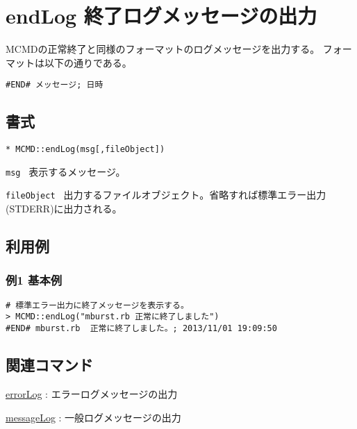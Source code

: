 
%

\section{endLog 終了ログメッセージの出力\label{sect:endLog}}
MCMDの正常終了と同様のフォーマットのログメッセージを出力する。
フォーマットは以下の通りである。

\begin{Verbatim}[baselinestretch=0.7,frame=single]
#END# メッセージ; 日時
\end{Verbatim}


\subsection{書式}

{\Large
\begin{verbatim}
* MCMD::endLog(msg[,fileObject])
\end{verbatim}
} 

\begin{description}
	\setlength{\itemindent}{-5mm}
	\item {\large \verb/msg /} 表示するメッセージ。
	\item {\large \verb/fileObject /} 出力するファイルオブジェクト。省略すれば標準エラー出力(STDERR)に出力される。
\end{description}

\subsection{利用例}
\subsubsection*{例1 基本例}

\begin{Verbatim}[baselinestretch=0.7,frame=single]
# 標準エラー出力に終了メッセージを表示する。
> MCMD::endLog("mburst.rb 正常に終了しました")
#END# mburst.rb  正常に終了しました。; 2013/11/01 19:09:50
\end{Verbatim}

\subsection{関連コマンド}
\hyperref[sect:errorLogRB]{errorLog} : エラーログメッセージの出力

\hyperref[sect:messageRB]{messageLog} : 一般ログメッセージの出力

%

